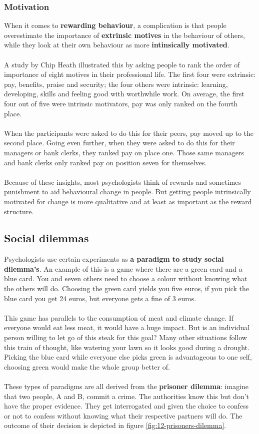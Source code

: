 \documentclass[../summary.tex]{subfiles}
\begin{document}
			\subsubsection{Motivation}
				When it comes to \textbf{rewarding behaviour}, a complication is that people overestimate the importance of \textbf{extrinsic motives} in the behaviour of others, while they look at their own behaviour as more \textbf{intinsically motivated}.\\
				\\
				A study by Chip Heath illustrated this by asking people to rank the order of importance of eight motives in their professional life. The first four were extrinsic: pay, benefits, praise and security; the four others were intrinsic: learning, developing, skills and feeling good with worthwhile work. On average, the first four out of five were intrinsic motivators, pay was only ranked on the fourth place. \\
				\\
				When the participants were asked to do this for their peers, pay moved up to the second place. Going even further, when they were asked to do this for their managers or bank clerks, they ranked pay on place one. Those same managers and bank clerks only ranked pay on position seven for themselves. \\
				\\
				Because of these insights, most psychologists think of rewards and sometimes punishment to aid behavioural change in people. But getting people intrinsically motivated for change is more qualitative and at least as important as the reward structure. 
		\newpage
		\subsection{Social dilemmas}
			Psychologists use certain experiments as \textbf{a paradigm to study social dilemma's}. An example of this is a game where there are a green card and a blue card. You and seven others need to choose a colour without knowing what the others will do. Choosing the green card yields you five euros, if you pick the blue card you get 24 euros, but everyone gets a fine of 3 euros. \\
			\\
			This game has parallels to the consumption of meat and climate change. If everyone would eat less meat, it would have a huge impact. But is an individual person willing to let go of this steak for this goal? Many other situations follow this train of thought, like watering your lawn so it looks good during a drought. Picking the blue card while everyone else picks green is advantageous to one self, choosing green would make the whole group better of. \\
			\\
			These types of paradigms are all derived from the \textbf{prisoner dilemma}: imagine that two people, A and B, commit a crime. The authorities know this but don't have the proper evidence. They get interrogated and given the choice to confess or not to confess without knowing what their respective partners will do. The outcome of their decision is  depicted in figure \ref{fig:12-prisoners-dilemma}. \\
			
\end{document}
